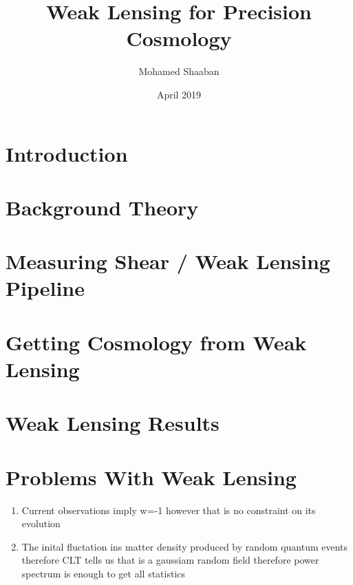 \documentclass{article}
\title{Weak Lensing for Precision Cosmology}
\author{Mohamed Shaaban}
\date{April 2019}
\begin{document}
\maketitle

\section{Introduction}


\section{Background Theory}


\section{Measuring Shear / Weak Lensing Pipeline}

\section{Getting Cosmology from Weak Lensing}
\cite{lensingbook} \cite{rachel_2018} \cite{hoekstra}

\section{Weak Lensing Results}
\cite{Subaru_2019}

\section{Problems With Weak Lensing}
\cite{massey_2013}

\begin{enumerate}
    \item Current observations imply w=-1 however that is no constraint on its evolution
    \item The inital fluctation ins matter density produced by random quantum events therefore CLT tells us that is a gaussiam random field therefore power spectrum is enough to get all statistics
\end{enumerate}



\end{document}
